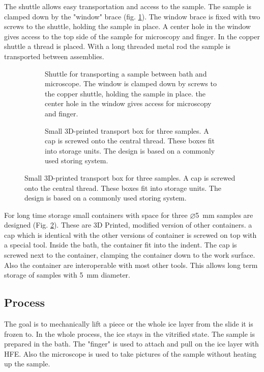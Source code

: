 The shuttle allows easy transportation and access to the sample. The sample is clamped down by the "window" brace (fig. \ref{fig:shuttle}). The window brace is fixed with two screws to the shuttle, holding the sample in place. A center hole in the window gives access to the top side of the sample for microscopy and finger. In the copper shuttle a thread is placed. With a long threaded metal rod the sample is transported between assemblies.

\begin{figure}[hbt!]
	\centering
	\begin{subfigure}[]{0.45\textwidth}
		\centering
		
		\caption{Shuttle for transporting a sample between bath and microscope. The window is clamped down by screws to the copper shuttle, holding the sample in place. the center hole in the window gives access for microscopy and finger.}
		\label{fig:shuttle}
	\end{subfigure}
	\begin{subfigure}[]{0.45\textwidth}
		\centering
		
		\caption{Small 3D-printed transport box for three samples. A cap is screwed onto the central thread. These boxes fit into storage units. The design is based on a commonly used storing system.\newline\newline}
		\label{fig:transportbox}
	\end{subfigure}
	\label{fig:shuttleandtransportbox}
\end{figure}

For long time storage small containers with space for three $\varnothing$\SI{5}{\milli\meter} samples are designed (Fig. \ref{fig:transportbox}). These are 3D Printed, modified version of other containers. a cap which is identical with the other versions of container is screwed on top with a special tool. Inside the bath, the container fit into the indent. The cap is screwed next to the container, clamping the container down to the work surface. Also the container are interoperable with most other tools. This allows long term storage of samples with \SI{5}{\milli\meter} diameter.

\FloatBarrier

\subsection{Process}
\label{section:Process}

The goal is to mechanically lift a piece or the whole ice layer from the slide it is frozen to. In the whole process, the ice stays in the vitrified state. The sample is prepared in the bath. The "finger" is used to attach and pull on the ice layer with HFE. Also the microscope is used to take pictures of the sample without heating up the sample.

